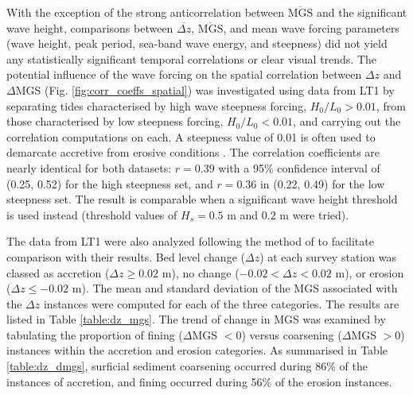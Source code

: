 With the exception of the strong anticorrelation between $\overline{\mathrm{MGS}}$ and the significant wave height, comparisons between $\overline{\Delta z}$, $\overline{\mathrm{MGS}}$, and mean wave forcing parameters (wave height, peak period, sea-band wave energy, and steepness) did not yield any statistically significant temporal correlations or clear visual trends. The potential influence of the wave forcing on the spatial correlation between $\Delta z$ and $\Delta$MGS (Fig. \ref{fig:corr_coeffs_spatial}) was investigated using data from LT1 by separating tides characterised by high wave steepness forcing, $H_0/L_0 > 0.01$, from those characterised by low steepness forcing, $H_0/L_0 < 0.01$, and carrying out the correlation computations on each. A steepness value of 0.01 is often used to demarcate accretive from erosive conditions \citep[e.g.,][]{Masselink_etal2007}. The correlation coefficients are nearly identical for both datasets: $r=0.39$ with a 95\% confidence interval of (0.25, 0.52) for the high steepness set, and $r=0.36$ in (0.22, 0.49) for the low steepness set. The result is comparable when a significant wave height threshold is used instead (threshold values of $H_{s} = 0.5$ m and $0.2$ m were tried).


The data from LT1 were also analyzed following the method of \citet{Masselink_etal2007} to facilitate comparison with their results. Bed level change ($\Delta z$) at each survey station was classed as accretion ($\Delta z \geq 0.02$ m), no change ($-0.02 < \Delta z < 0.02$ m), or erosion ($\Delta z \leq -0.02$ m). The mean and standard deviation of the MGS associated with the $\Delta z$ instances were computed for each of the three categories. The results are listed in Table \ref{table:dz_mgs}. The trend of change in MGS was examined by tabulating the proportion of fining ($\Delta$MGS $< 0$) versus coarsening ($\Delta$MGS $> 0$) instances within the accretion and erosion categories. As summarised in Table \ref{table:dz_dmgs}, surficial sediment coarsening occurred during 86\% of the instances of accretion, and fining occurred during 56\% of the erosion instances. %

